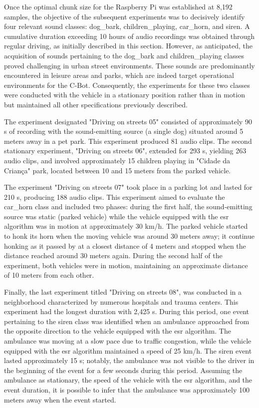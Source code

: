 Once the optimal chunk size for the Raspberry Pi was established at 8,192 samples, the objective of the subsequent experiments was to decisively identify four relevant sound classes: dog\_bark, children\_playing, car\_horn, and siren. A cumulative duration exceeding 10 hours of audio recordings was obtained through regular driving, as initially described in this section. However, as anticipated, the acquisition of sounds pertaining to the dog\_bark and children\_playing classes proved challenging in urban street environments. These sounds are predominantly encountered in leisure areas and parks, which are indeed target operational environments for the C-Bot. Consequently, the experiments for these two classes were conducted with the vehicle in a stationary position rather than in motion but maintained all other specifications previously described.

The experiment designated "Driving on streets 05" consisted of approximately 90 \gls{s} of recording with the sound-emitting source (a single dog) situated around 5 meters away in a pet park. This experiment produced 81 audio clips. The second stationary experiment, "Driving on streets 06", extended for 293 \gls{s}, yielding 263 audio clips, and involved approximately 15 children playing in "Cidade da Criança" park, located between 10 and 15 meters from the parked vehicle.

The experiment "Driving on streets 07" took place in a parking lot and lasted for 210 \gls{s}, producing 188 audio clips. This experiment aimed to evaluate the car\_horn class and included two phases: during the first half, the sound-emitting source was static (parked vehicle) while the vehicle equipped with the \gls{esr} algorithm was in motion at approximately 30 km/h. The parked vehicle started to honk its horn when the moving vehicle was around 30 meters away; it continue honking as it passed by at a closest distance of 4 meters and stopped when the distance reached around 30 meters again. During the second half of the experiment, both vehicles were in motion, maintaining an approximate distance of 10 meters from each other.

Finally, the last experiment titled "Driving on streets 08", was conducted in a neighborhood characterized by numerous hospitals and trauma centers. This experiment had the longest duration with 2,425 \gls{s}. During this period, one event pertaining to the siren class was identified when an ambulance approached from the opposite direction to the vehicle equipped with the \gls{esr} algorithm. The ambulance was moving at a slow pace due to traffic congestion, while the vehicle equipped with the \gls{esr} algorithm maintained a speed of 25 km/h. The siren event lasted approximately 15 \gls{s}; notably, the ambulance was not visible to the driver in the beginning of the event for a few seconds during this period. Assuming the ambulance as stationary, the speed of the vehicle with the \gls{esr} algorithm, and the event duration, it is possible to infer that the ambulance was approximately 100 meters away when the event started.

